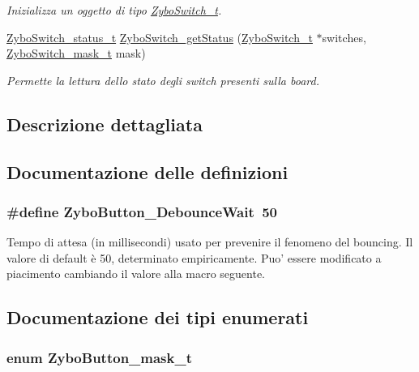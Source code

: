 \begin{DoxyCompactItemize}
\begin{DoxyCompactList}\small\item\em Inizializza un oggetto di tipo \hyperlink{struct_zybo_switch__t}{Zybo\+Switch\+\_\+t}. \end{DoxyCompactList}\item 
\hyperlink{group___zybo_ga4ba6b49b2f47ebb464aefcea7e23e04a}{Zybo\+Switch\+\_\+status\+\_\+t} \hyperlink{group___zybo_gafac8daf9a9a585f8f20ef2a6fa883a1f}{Zybo\+Switch\+\_\+get\+Status} (\hyperlink{struct_zybo_switch__t}{Zybo\+Switch\+\_\+t} $\ast$switches, \hyperlink{group___zybo_ga2e0602a824354f25c395f938caba3703}{Zybo\+Switch\+\_\+mask\+\_\+t} mask)
\begin{DoxyCompactList}\small\item\em Permette la lettura dello stato degli switch presenti sulla board. \end{DoxyCompactList}\end{DoxyCompactItemize}


\subsection{Descrizione dettagliata}


\subsection{Documentazione delle definizioni}
\hypertarget{group___zybo_ga8960eefa6a431f50d4fe2a2f8063da3f}{
\subsubsection[{Zybo\+Button\+\_\+\+Debounce\+Wait}]{\setlength{\rightskip}{0pt plus 5cm}\#define Zybo\+Button\+\_\+\+Debounce\+Wait~50}}\label{group___zybo_ga8960eefa6a431f50d4fe2a2f8063da3f}


Tempo di attesa (in millisecondi) usato per prevenire il fenomeno del bouncing. Il valore di default è 50, determinato empiricamente. Puo' essere modificato a piacimento cambiando il valore alla macro seguente. 



\subsection{Documentazione dei tipi enumerati}
\hypertarget{group___zybo_ga4d26a5f6cad606de534ba034e0ba42dd}{
\subsubsection[{Zybo\+Button\+\_\+mask\+\_\+t}]{\setlength{\rightskip}{0pt plus 5cm}enum {\bf Zybo\+Button\+\_\+mask\+\_\+t}}}\label{group___zybo_ga4d26a5f6cad606de534ba034e0ba42dd}


